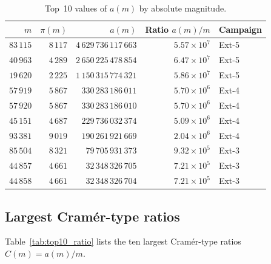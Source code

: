 \documentclass{amsart}
\theoremstyle{definition}
\theoremstyle{remark}
\numberwithin{equation}{section}
\begin{document}
\begin{table}[ht]
\centering
\caption{Top~10 values of $a(m)$ by absolute magnitude.}
\label{tab:top10_absolute}
\small
\begin{tabular}{rrrrl}
\toprule
$m$ & $\pi(m)$ & $a(m)$ & Ratio $a(m)/m$ & Campaign \\
\midrule
$83\,115$ & $8\,117$ & $4\,629\,736\,117\,663$ & $5.57 \times 10^7$ & Ext-5 \\
$40\,963$ & $4\,289$ & $2\,650\,225\,478\,854$ & $6.47 \times 10^7$ & Ext-5 \\
$19\,620$ & $2\,225$ & $1\,150\,315\,774\,321$ & $5.86 \times 10^7$ & Ext-5 \\
$57\,919$ & $5\,867$ & $330\,283\,186\,011$ & $5.70 \times 10^6$ & Ext-4 \\
$57\,920$ & $5\,867$ & $330\,283\,186\,010$ & $5.70 \times 10^6$ & Ext-4 \\
$45\,151$ & $4\,687$ & $229\,736\,032\,374$ & $5.09 \times 10^6$ & Ext-4 \\
$93\,381$ & $9\,019$ & $190\,261\,921\,669$ & $2.04 \times 10^6$ & Ext-4 \\
$85\,504$ & $8\,321$ & $79\,705\,931\,373$ & $9.32 \times 10^5$ & Ext-3 \\
$44\,857$ & $4\,661$ & $32\,348\,326\,705$ & $7.21 \times 10^5$ & Ext-3 \\
$44\,858$ & $4\,661$ & $32\,348\,326\,704$ & $7.21 \times 10^5$ & Ext-3 \\
\bottomrule
\end{tabular}
\end{table}

\subsection{Largest Cram\'er-type ratios}

Table~\ref{tab:top10_ratio} lists the ten largest
Cram\'er-type ratios $C(m) = a(m)/m$.
\end{document}
